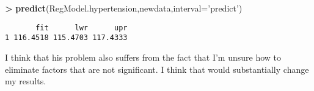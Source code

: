 \documentclass[]{article}
\newenvironment{Shaded}{\begin{snugshade}}{\end{snugshade}}
\newcommand{\KeywordTok}[1]{\textcolor[rgb]{0.13,0.29,0.53}{\textbf{#1}}}
\newcommand{\DataTypeTok}[1]{\textcolor[rgb]{0.13,0.29,0.53}{#1}}
\newcommand{\StringTok}[1]{\textcolor[rgb]{0.31,0.60,0.02}{#1}}
\newcommand{\OperatorTok}[1]{\textcolor[rgb]{0.81,0.36,0.00}{\textbf{#1}}}
\newcommand{\NormalTok}[1]{#1}
\begin{document}
\begin{Shaded}
\begin{Highlighting}[]
\OperatorTok{>}\StringTok{ }\KeywordTok{predict}\NormalTok{(RegModel.hypertension,newdata,}\DataTypeTok{interval=}\StringTok{'predict'}\NormalTok{)}
\end{Highlighting}
\end{Shaded}

\begin{verbatim}
       fit      lwr      upr
1 116.4518 115.4703 117.4333
\end{verbatim}

I think that his problem also suffers from the fact that I'm unsure how
to eliminate factors that are not significant. I think that would
substantially change my results.
\end{document}
